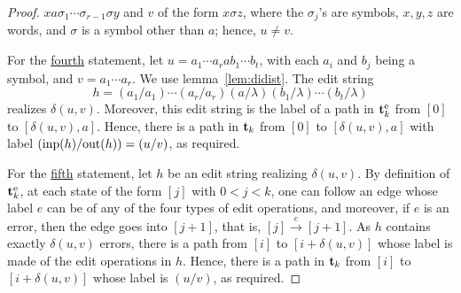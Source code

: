 \documentclass{article}
\theoremstyle{plain}
\theoremstyle{definition}
\theoremstyle{remark}
\newcommand{\xra}[1]{\xrightarrow{#1}}
\newcommand{\e}{\lambda}
\newcommand\tsid{\trt_{k}}
\newcommand\dsid{\ensuremath{\delta}\xspace}
\newcommand{\etsid}{\tsid^{\mathrm{e}}}
\newcommand\out{\mathrm{out}}
\begin{document}
\begin{proof}
$xa\sigma_1\cdots\sigma_{r-1}\sigma y$ and $v$ of the form $x\sigma z$, where the
$\sigma_j$'s are symbols, $x,y,z$ are words, and $\sigma$ is a symbol other than $a$; hence,
$u\not=v$.
\par
For the \underline{fourth} statement, let $u=a_1\cdots a_r ab_1\cdots b_t$, with each $a_i$ and $b_j$ being a symbol,
and $v=a_1\cdots a_r$.
We use lemma~\ref{lem:didist}.
The edit string $$h=(a_1/a_1)\cdots(a_r/a_r)(a/\e)(b_1/\e)\cdots(b_t/\e)$$
realizes $\dsid(u,v)$. Moreover, this edit string is the label of a path in $\etsid$ from
$[0]$ to $[\dsid(u,v),a]$. Hence, there is a path
in $\tsid$ from $[0]$ to $[\dsid(u,v),a]$ with
label $(\inp(h)/\out(h))=(u/v)$, as required.
\par
For the \underline{fifth} statement, let $h$ be an edit string realizing $\dsid(u,v)$. By definition
of $\etsid$, at each state of the form $[j]$ with $0<j<k$, one can follow an edge whose
label $e$ can be of any of the
four types of edit operations, and moreover, if $e$ is an error, then the edge goes into $[j+1]$,
that is, $[j]\xra{e}[j+1]$.
As $h$ contains exactly $\dsid(u,v)$ errors, there is a path from $[i]$ to $[i+\dsid(u,v)]$ whose label is made of the edit operations in $h$. Hence, there is a path in $\tsid$ from $[i]$ to $[i+\dsid(u,v)]$ whose label is $(u/v)$, as required.
\end{proof}
\end{document}
